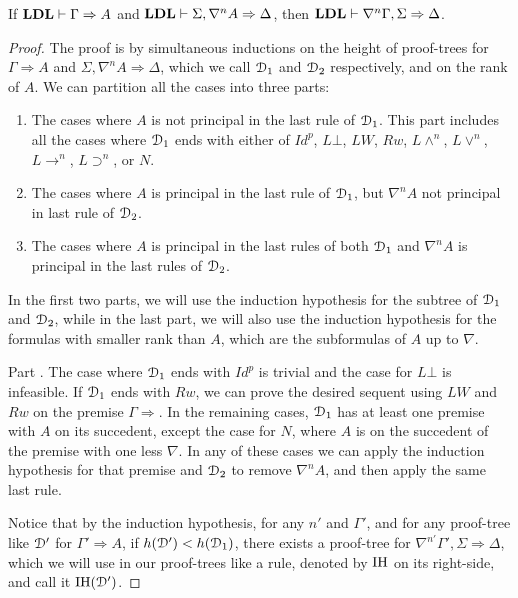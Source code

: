 \begin{thm}
  If $\mathbf{LDL} \vdash \Gamma \Rightarrow A$ and $\mathbf{LDL} \vdash \Sigma, \nabla^n A \Rightarrow \Delta$, then $\mathbf{LDL} \vdash \nabla^n \Gamma, \Sigma \Rightarrow \Delta$.
\end{thm}
\begin{proof}
  The proof is by simultaneous inductions on the height of proof-trees for $\Gamma \Rightarrow A$ and $\Sigma, \nabla^n A \Rightarrow \Delta$, which we call $\mathcal{D}_1$ and $\mathcal{D}_2$ respectively, and on the rank of $A$. We can partition all the cases into three parts:
  \begin{enumerate}
    \item The cases where $A$ is not principal in the last rule of $\mathcal{D}_1$. This part includes all the cases where $\mathcal{D}_1$ ends with either of $Id^p$, $L \bot$, $LW$, $Rw$, $L \wedge ^n$, $L \vee ^n$, $L \rightarrow ^n$, $L \supset ^n$, or $N$.

    \item The cases where $A$ is principal in the last rule of $\mathcal{D}_1$, but $\nabla^n A$ not principal in last rule of $\mathcal{D}_2$.

    \item The cases where $A$ is principal in the last rules of both $\mathcal{D}_1$ and $\nabla^n A$ is principal in the last rules of $\mathcal{D}_2$.
  \end{enumerate}
  In the first two parts, we will use the induction hypothesis for the subtree of $\mathcal{D}_1$ and $\mathcal{D}_2$, while in the last part, we will also use the induction hypothesis for the formulas with smaller rank than $A$, which are the subformulas of $A$ up to $\nabla$.

  Part \1. The case where $\mathcal{D}_1$ ends with $Id^p$ is trivial and the case for $L \bot$ is infeasible. If $\mathcal{D}_1$ ends with $Rw$, we can prove the desired sequent using $LW$ and $Rw$ on the premise $\Gamma \Rightarrow$. In the remaining cases, $\mathcal{D}_1$ has at least one premise with $A$ on its succedent, except the case for $N$, where $A$ is on the succedent of the premise with one less $\nabla$. In any of these cases we can apply the induction hypothesis for that premise and $\mathcal{D}_2$ to remove $\nabla^n A$, and then apply the same last rule.

  Notice that by the induction hypothesis, for any $n'$ and $\Gamma'$, and for any proof-tree like $\mathcal{D}'$ for $\Gamma' \Rightarrow A$, if $h(\mathcal{D}') < h(\mathcal{D}_1)$, there exists a proof-tree for $\nabla^{n'} \Gamma', \Sigma \Rightarrow \Delta$, which we will use in our proof-trees like a rule, denoted by $\mathrm{IH}$ on its right-side, and call it $\mathrm{IH}(\mathcal{D}')$.


\end{proof}
